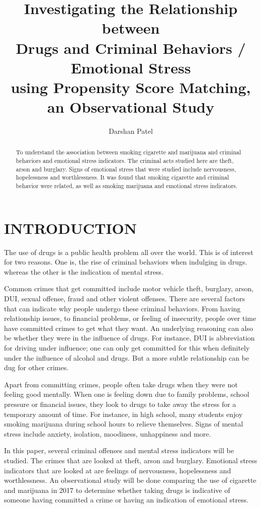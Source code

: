\documentclass[a4paper, 10pt, conference]{ieeeconf}
\title{\Large \bf
Investigating the Relationship between \\ Drugs and Criminal Behaviors / Emotional Stress \\ using Propensity Score Matching, an Observational Study}
\author{Darshan Patel}
\begin{document}
\maketitle
\thispagestyle{fancy}
\begin{abstract}

To understand the association between smoking cigarette and marijuana and criminal behaviors and emotional stress indicators. The criminal acts studied here are theft, arson and burglary. Signs of emotional stress that were studied include nervousness, hopelessness and worthlessness. It was found that smoking cigarette and criminal behavior were related, as well as smoking marijuana and emotional stress indicators. 
\end{abstract}

\section{INTRODUCTION}

The use of drugs is a public health problem all over the world. This is of interest for two reasons. One is, the rise of criminal behaviors when indulging in drugs. whereas the other is the indication of mental stress. 

Common crimes that get committed include motor vehicle theft, burglary, arson, DUI, sexual offense, fraud and other violent offenses. There are several factors that can indicate why people undergo these criminal behaviors. From having relationship issues, to financial problems, or feeling of insecurity, people over time have committed crimes to get what they want. An underlying reasoning can also be whether they were in the influence of drugs. For instance, DUI is abbreviation for driving under influence; one can only get committed for this when definitely under the influence of alcohol and drugs. But a more subtle relationship can be dug for other crimes. 

Apart from committing crimes, people often take drugs when they were not feeling good mentally. When one is feeling down due to family problems, school pressure or financial issues, they look to drugs to take away the stress for a temporary amount of time. For instance, in high school, many students enjoy smoking marijuana during school hours to relieve themselves. Signs of mental stress include anxiety, isolation, moodiness, unhappiness and more. 

In this paper, several criminal offenses and mental stress indicators will be studied. The crimes that are looked at theft, arson and burglary. Emotional stress indicators that are looked at are feelings of nervousness, hopelessness and worthlessness. An observational study will be done comparing the use of cigarette and marijuana in 2017 to determine whether taking drugs is indicative of someone having committed a crime or having an indication of emotional stress.
\end{document}
